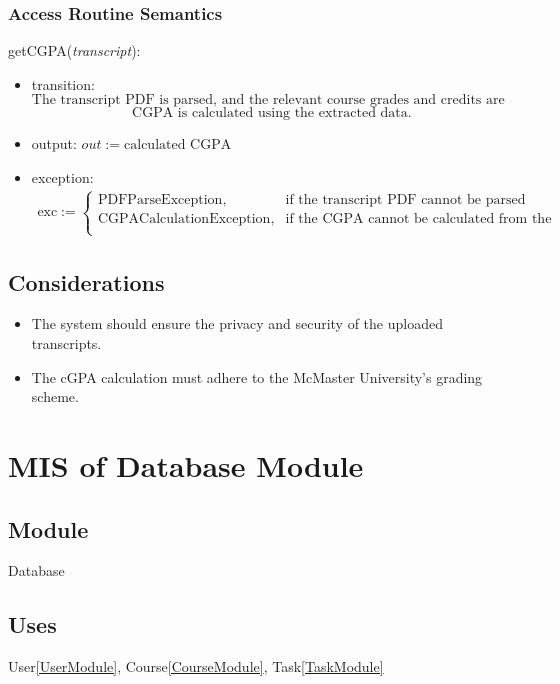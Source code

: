 \documentclass[12pt, titlepage]{article}
\begin{document}
\begin{itemize}
\subsubsection{Access Routine Semantics}

\noindent getCGPA(\textit{transcript}):
\begin{itemize}
\item transition: 
\[
\text{The transcript PDF is parsed, and the relevant course grades and credits are extracted.}
\]
\[
\text{CGPA is calculated using the extracted data.}
\]
\item output: \( out := \text{calculated CGPA} \)
\item exception: 
\[
\begin{array}{l}
\text{exc} := \begin{cases}
\text{PDFParseException}, & \text{if the transcript PDF cannot be parsed} \\
\text{CGPACalculationException}, & \text{if the CGPA cannot be calculated from the extracted data} \\
\end{cases}
\end{array}
\]
\end{itemize}

\subsection{Considerations}
\begin{itemize}
  \item The system should ensure the privacy and security of the uploaded transcripts.
  \item The cGPA calculation must adhere to the McMaster University's grading scheme.
\end{itemize}


\newpage
\section{MIS of Database Module} \label{DatabaseModule}

\subsection{Module}
Database

\subsection{Uses}
User\ref{UserModule}, Course\ref{CourseModule}, Task\ref{TaskModule}


\end{itemize}
\end{document}
